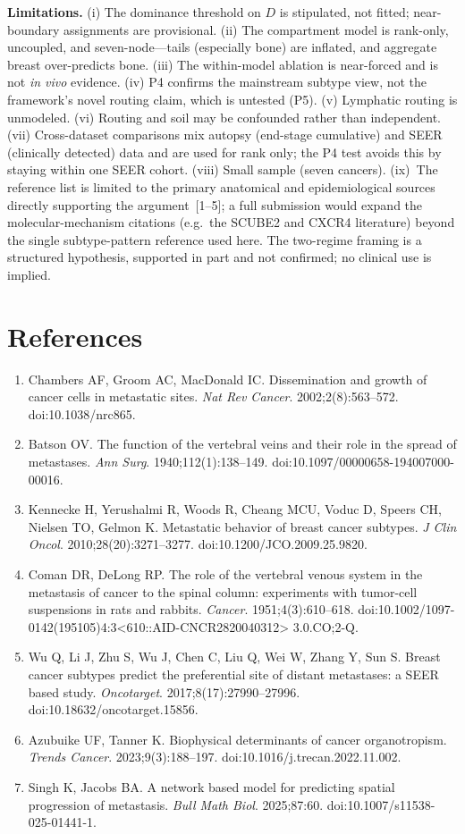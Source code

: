 \documentclass[11pt]{article}
\begin{document}
\textbf{Limitations.} (i) The dominance threshold on $D$ is stipulated, not fitted;
near-boundary assignments are provisional. (ii) The compartment model is
rank-only, uncoupled, and seven-node---tails (especially bone) are inflated, and
aggregate breast over-predicts bone. (iii) The within-model ablation is near-forced
and is not \emph{in vivo} evidence. (iv) P4 confirms the mainstream subtype view,
not the framework's novel routing claim, which is untested (P5). (v) Lymphatic
routing is unmodeled. (vi) Routing and soil may be confounded rather than
independent. (vii) Cross-dataset comparisons mix autopsy (end-stage cumulative)
and SEER (clinically detected) data and are used for rank only; the P4 test avoids
this by staying within one SEER cohort. (viii) Small sample (seven cancers).
(ix)~The reference list is limited to the primary anatomical and
epidemiological sources directly supporting the argument~[1--5]; a full
submission would expand the molecular-mechanism citations (e.g.\ the SCUBE2 and
CXCR4 literature) beyond the single subtype-pattern reference used here. The
two-regime framing is a structured hypothesis, supported in part and not
confirmed; no clinical use is implied.

\section*{References}
{\footnotesize
\begin{enumerate}[leftmargin=2em,itemsep=0.15em]
  \item Chambers AF, Groom AC, MacDonald IC. Dissemination and growth of cancer
  cells in metastatic sites. \emph{Nat Rev Cancer}. 2002;2(8):563--572.
  doi:10.1038/nrc865.
  \item Batson OV. The function of the vertebral veins and their role in the
  spread of metastases. \emph{Ann Surg}. 1940;112(1):138--149.
  doi:10.1097/00000658-194007000-00016.
  \item Kennecke H, Yerushalmi R, Woods R, Cheang MCU, Voduc D, Speers CH,
  Nielsen TO, Gelmon K. Metastatic behavior of breast cancer subtypes.
  \emph{J Clin Oncol}. 2010;28(20):3271--3277. doi:10.1200/JCO.2009.25.9820.
  \item Coman DR, DeLong RP. The role of the vertebral venous system in the
  metastasis of cancer to the spinal column: experiments with tumor-cell
  suspensions in rats and rabbits. \emph{Cancer}. 1951;4(3):610--618.
  doi:10.1002/1097-0142(195105)4:3\textless610::AID-CNCR2820040312\textgreater
  3.0.CO;2-Q.
  \item Wu Q, Li J, Zhu S, Wu J, Chen C, Liu Q, Wei W, Zhang Y, Sun S. Breast
  cancer subtypes predict the preferential site of distant metastases: a SEER
  based study. \emph{Oncotarget}. 2017;8(17):27990--27996.
  doi:10.18632/oncotarget.15856.
  \item Azubuike UF, Tanner K. Biophysical determinants of cancer organotropism.
  \emph{Trends Cancer}. 2023;9(3):188--197. doi:10.1016/j.trecan.2022.11.002.
  \item Singh K, Jacobs BA. A network based model for predicting spatial
  progression of metastasis. \emph{Bull Math Biol}. 2025;87:60.
  doi:10.1007/s11538-025-01441-1.
\end{enumerate}}
\end{document}
